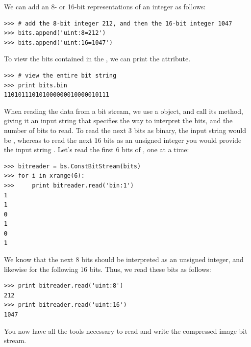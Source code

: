 We can add an 8- or 16-bit representations of an integer as follows:
\begin{lstlisting}
>>> # add the 8-bit integer 212, and then the 16-bit integer 1047
>>> bits.append('uint:8=212')
>>> bits.append('uint:16=1047')
\end{lstlisting}
To view the bits contained in the , we can print the  attribute.
\begin{lstlisting}
>>> # view the entire bit string
>>> print bits.bin
110101110101000000010000010111
\end{lstlisting}

When reading the data from a bit stream, we use a  object, and call its  method, giving it an input string
that specifies the way to interpret the bits, and the number of bits to read.
To read the next 3 bits as binary, the input string would be , whereas to read the next 16 bits as an unsigned integer
you would provide the input string .
Let's read the first 6 bits of , one at a time:
\begin{lstlisting}
>>> bitreader = bs.ConstBitStream(bits)
>>> for i in xrange(6):
>>>     print bitreader.read('bin:1')
1
1
0
1
0
1
\end{lstlisting}
We know that the next 8 bits should be interpreted as an unsigned integer, and likewise for the
following 16 bits. Thus, we read these bits as follows:
\begin{lstlisting}
>>> print bitreader.read('uint:8')
212
>>> print bitreader.read('uint:16')
1047
\end{lstlisting}

You now have all the tools necessary to read and write the compressed image bit stream.

